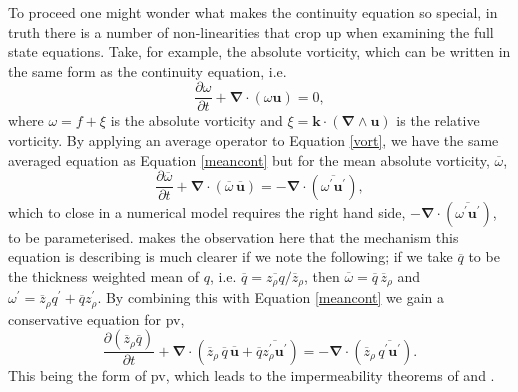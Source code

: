 \documentclass[10pt,a4paper]{article}
\newcommand*\mean[1]{\overline{#1}}
\newcommand*\res[1]{{#1}^{\prime}}
\begin{document}
         To proceed one might wonder what makes the continuity equation
         so special, in truth there is a number of non-linearities that
         crop up when examining the full state equations. Take, for example, the
         absolute vorticity, which can be written in the same form as the continuity equation, i.e.
           \begin{equation}
           \frac{\partial \omega}{\partial t} + \boldsymbol{\nabla}\cdot\left(\omega\boldsymbol{u}\right) = 0,
           \label{vort}
           \end{equation}
           where $\omega=f+\xi$ is the absolute vorticity and
           $\xi = \boldsymbol{k} \cdot\left( \boldsymbol{\nabla}\wedge \boldsymbol{u}\right)$ is the relative vorticity. 
           By applying an average operator to Equation \ref{vort}, we have the same averaged equation as Equation \ref{meancont} but for the mean absolute vorticity, $\mean{\omega}$,
                \begin{equation}
                \frac{\partial \mean{\omega}}{\partial t} + \boldsymbol{\nabla}\cdot\left(\mean{\omega} \, \mean{\boldsymbol{u}}\right) = - \boldsymbol{\nabla}\cdot\left(\mean{\res{\omega} \res{\boldsymbol{u}}}\right),
                \end{equation}
                which to close in a numerical model requires the
                right hand side, $- \boldsymbol{\nabla}\cdot\left(\mean{\res{\omega} \res{\boldsymbol{u}}}\right)$, to be parameterised.
                \cite{greatbatch1998exploring} makes the observation
                here that the mechanism this equation is describing 
                is much clearer if we note the following; if we take
                $\mean{q}$ to be the thickness weighted mean of $q$, i.e.
                $\mean{q}=\mean{z_{\rho}q}/\mean{z}_{\rho}$, then 
                $\mean{\omega}=\mean{q}\,\mean{z}_{\rho}$ and $\res{\omega}=\mean{z}_{\rho}\res{q}+\mean{q}\res{z}_{\rho}$. By 
                combining this with Equation \ref{meancont} we gain a conservative equation 
                for \gls{pv}, 
                \begin{equation}
                \frac{\partial \left(\mean{z}_{\rho} \mean{q}\right)}{\partial t} +
                 \boldsymbol{\nabla}\cdot\left(\mean{z}_{\rho}\,\mean{q}\,\mean{\boldsymbol{u}}+\mean{q}\mean{\res{z}_{\rho} \res{\boldsymbol{u}}}\right)
                 = - \boldsymbol{\nabla}\cdot\left(\mean{z}_{\rho}\,\mean{\res{q} \res{\boldsymbol{u}}}\right) .
                 \label{meanpveq}
                \end{equation}
                This being the form of \gls{pv}, which leads to the impermeability theorems
                of \cite{haynes1987evolution} and \cite{haynes1990conservation}.
                
\end{document}
